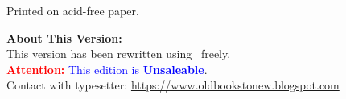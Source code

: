 \begin{copyrightpage}
%

\vspace*{5pt}

Printed on acid-free paper.

\vspace*{20pt}
\textbf{About This Version:}\\
%

This version has been rewritten using \LaTeXe\ freely.\\

\textcolor{red}{\textbf{Attention:}} \textcolor{blue}{This edition is \textbf{Unsaleable}}.\\
Contact with typesetter: \url{https://www.oldbookstonew.blogspot.com}
\end{copyrightpage}